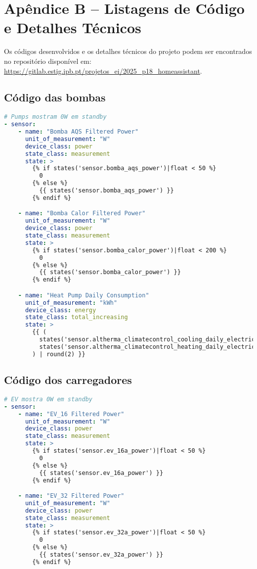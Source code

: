 \chapter{Apêndice B – Listagens de Código e
Detalhes Técnicos
}
\label{apendice2}

Os códigos desenvolvidos e os detalhes técnicos do projeto podem ser encontrados no repositório disponível em: \url{https://gitlab.estig.ipb.pt/projetos_ei/2025_p18_homeassistant}.

\section{Código das bombas}

\lstset{inputencoding=ascii}
\begin{lstlisting}[language=YAML, caption={pumps.yaml}]
# Pumps mostram 0W em standby
- sensor:
    - name: "Bomba AQS Filtered Power"
      unit_of_measurement: "W"
      device_class: power
      state_class: measurement
      state: >
        {% if states('sensor.bomba_aqs_power')|float < 50 %}
          0
        {% else %}
          {{ states('sensor.bomba_aqs_power') }}
        {% endif %}

    - name: "Bomba Calor Filtered Power"
      unit_of_measurement: "W"
      device_class: power
      state_class: measurement
      state: >
        {% if states('sensor.bomba_calor_power')|float < 200 %}
          0
        {% else %}
          {{ states('sensor.bomba_calor_power') }}
        {% endif %}

    - name: "Heat Pump Daily Consumption"
      unit_of_measurement: "kWh"
      device_class: energy
      state_class: total_increasing
      state: >
        {{ (
          states('sensor.altherma_climatecontrol_cooling_daily_electrical_consumption') | float(0) +
          states('sensor.altherma_climatecontrol_heating_daily_electrical_consumption') | float(0)
        ) | round(2) }}

\end{lstlisting}


\section{Código dos carregadores}

\lstset{inputencoding=ascii}
\begin{lstlisting}[language=YAML, caption={ev.yaml}]
# EV mostra 0W em standby
- sensor:
    - name: "EV_16 Filtered Power"
      unit_of_measurement: "W"
      device_class: power
      state_class: measurement
      state: >
        {% if states('sensor.ev_16a_power')|float < 50 %}
          0
        {% else %}
          {{ states('sensor.ev_16a_power') }}
        {% endif %}

    - name: "EV_32 Filtered Power"
      unit_of_measurement: "W"
      device_class: power
      state_class: measurement
      state: >
        {% if states('sensor.ev_32a_power')|float < 50 %}
          0
        {% else %}
          {{ states('sensor.ev_32a_power') }}
        {% endif %}

\end{lstlisting}

